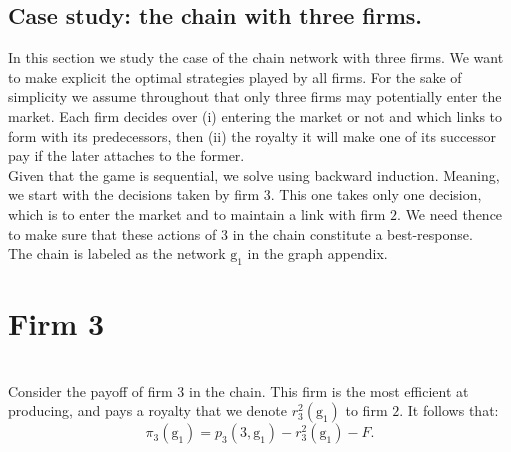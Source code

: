 \documentclass{article}
\begin{document}
\section{Case study: the chain with three firms.}

In this section we study the case of the chain network with three firms. We want to make explicit the optimal strategies played by all firms. For the sake of simplicity we assume throughout that only three firms may potentially enter the market. Each firm decides over (i) entering the market or not and which links to form with its predecessors, then (ii) the royalty it will make one of its successor pay if the later attaches to the former. \\

\indent Given that the game is sequential, we solve using backward induction. Meaning, we start with the decisions taken by firm $3$. This one takes only one decision, which is to enter the market and to maintain a link with firm $2$. We need thence to make sure that these actions of $3$ in the chain constitute a best-response. \\

The chain is labeled as the network $\text{g}_1$ in the graph appendix. 

\indent \chapter{\textbf{Firm 3}}\\
Consider the payoff of firm $3$ in the chain. This firm is the most efficient at producing, and pays a royalty that we denote $r^2_3(\text{g}_1)$ to firm $2$. It follows that: 
\begin{equation*}
    \pi_3(\text{g}_1)= p_3(3,\text{g}_1)-r^2_3(\text{g}_1)-F. 
\end{equation*}
\end{document}
